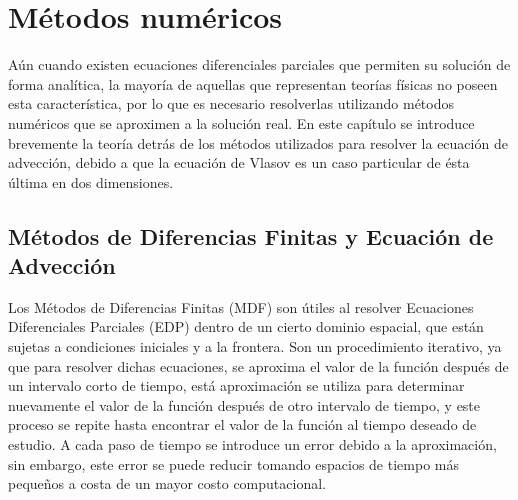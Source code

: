 \documentclass[11pt,twoside,openright,spanish]{report}
\numberwithin{equation}{chapter}
\numberwithin{figure}{chapter}
\numberwithin{table}{chapter}
\begin{document}

\chapter{Métodos numéricos}\label{metnum}
\noindent
Aún cuando existen ecuaciones diferenciales parciales que permiten su solución de forma analítica, la mayoría de aquellas que representan teorías físicas no poseen esta característica, por lo que es necesario resolverlas utilizando métodos numéricos que se aproximen a la solución real. En este capítulo se introduce brevemente la teoría detrás de los métodos utilizados para resolver la ecuación de advección, debido a que la ecuación de Vlasov es un caso particular de ésta última en dos dimensiones.


\section{Métodos de Diferencias Finitas y Ecuación de Advección}
\noindent
Los Métodos de Diferencias Finitas (MDF) son útiles al resolver Ecuaciones Diferenciales Parciales (EDP) dentro de un cierto dominio espacial, que están sujetas a condiciones iniciales y a la frontera. Son un procedimiento iterativo, ya que para resolver dichas ecuaciones, se aproxima el valor de la función después de un intervalo corto de tiempo, está aproximación se utiliza para determinar nuevamente el valor de la función después de otro intervalo de tiempo, y este proceso se repite hasta encontrar el valor de la función al tiempo deseado de estudio. A cada paso de tiempo se introduce un error debido a la aproximación, sin embargo, este error se puede reducir tomando espacios de tiempo más pequeños a costa de un mayor costo computacional.
\end{document}
